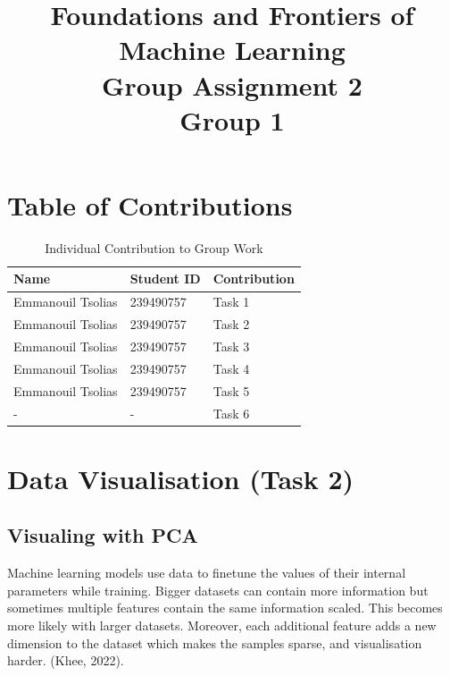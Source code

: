 \documentclass{article}
\begin{document}
\title{Foundations and Frontiers of Machine Learning\\Group Assignment 2\\Group 1}
\author{}
\date{}
\maketitle

\tableofcontents
\newpage

\listoffigures
\listoftables
\newpage

\section{Table of Contributions}

\begin{table}[h!]
    \centering
    \begin{tabular}{|l|l|l|}
        \hline
        \textbf{Name} & \textbf{Student ID} & \textbf{Contribution} \\ \hline
        Emmanouil Tsolias       & 239490757 & Task 1 \\ \hline
        Emmanouil Tsolias       & 239490757 & Task 2 \\ \hline
        Emmanouil Tsolias       & 239490757 & Task 3 \\ \hline
        Emmanouil Tsolias       & 239490757 & Task 4 \\ \hline
        Emmanouil Tsolias       & 239490757 & Task 5 \\ \hline
        -       & - & Task 6 \\ \hline
    \end{tabular}
    \caption{Individual Contribution to Group Work}
    \label{tab:contributions}
\end{table}
\newpage

\section{Data Visualisation (Task 2)}
\subsection{Visualing with PCA}

Machine learning models use data to finetune the values of their internal parameters while training.
Bigger datasets can contain more information but sometimes multiple features contain the same information scaled.
This becomes more likely with larger datasets.
Moreover, each additional feature adds a new dimension to the dataset which makes the samples sparse, and visualisation harder. (Khee, 2022).
\end{document}

